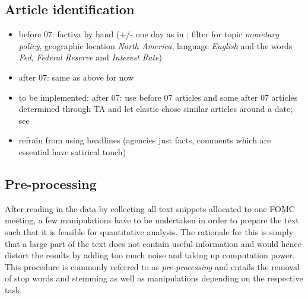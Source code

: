 \subsection{Article identification}\label{subsec:ArticleID}


\begin{itemize}
	\item before 07: factiva by hand (+/- one day as in \textcite{Ellingsen.2003}; filter for topic \textit{monetary policy}, geographic location \textit{North America}, language \textit{English} and the words \textit{Fed}, \textit{Federal Reserve} and \textit{Interest Rate})
	\item after 07: same as above for now
	\item to be implemented: after 07: use before 07 articles and some after 07 articles determined through TA and let elastic chose similar articles around a date; see \textcite{Elastic.2015} 
	\item refrain from using headlines (agencies just facts, comments which are essential have satirical touch)
\end{itemize}
%


\subsection{Pre-processing}

After reading in the data by collecting all text snippets allocated to one FOMC meeting, a few manipulations have to be undertaken in order to prepare the text such that it is feasible for quantitative analysis. The rationale for this is simply that a large part of the text does not contain useful information and would hence distort the results by adding too much noise and taking up computation power. This procedure is commonly referred to as \textit{pre-processing} and entails the removal of stop words and stemming as well as manipulations depending on the respective task.

